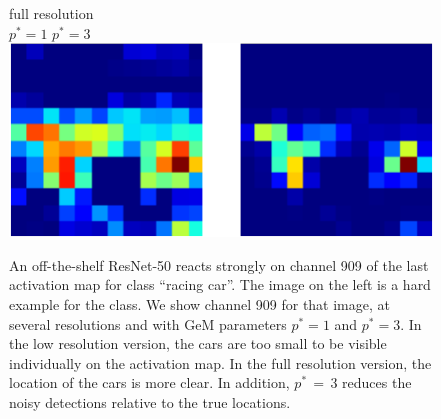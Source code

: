 \begin{figure}
{\begin{minipage}{0.5\columnwidth}
full resolution \\

$p^* = 1$ \hspace{1cm} $p^* = 3$ \\

\includegraphics[width=0.8\columnwidth]{figs/per_channel_maps/2/activ_fullres.pdf}
\end{minipage}}
\vspace{-5pt}

\caption{\label{fig:heatmap}
    An off-the-shelf ResNet-50 reacts strongly on channel 909 of the last activation map for class ``racing car''. 
    The image on the left is a hard example for the class.     
    We show channel 909 for that image, at several resolutions and with GeM parameters $p^*=1$ and $p^*=3$.
   	In the low resolution version, the cars are too small to be visible individually on the activation map. 
	In the full resolution version, the location of the cars is more clear. 
	In addition, $p^*$\,$=$\,$3$ reduces the noisy detections relative to the true locations. 
}
\vspace{-7pt}
\end{figure}

%
%

%

%
%
%
%
%
%
%
%
